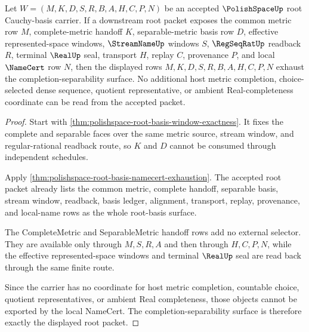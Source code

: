 \begin{theorem}
\label{thm:polishspace-root-completion-separability-exhaustion}
Let $W=(M,K,D,S,R,B,A,H,C,P,N)$ be an accepted $\PolishSpaceUp$ root Cauchy-basis carrier. If a downstream root packet exposes the common metric row $M$, complete-metric handoff $K$, separable-metric basis row $D$, effective represented-space windows, $\StreamNameUp$ windows $S$, $\RegSeqRatUp$ readback $R$, terminal $\RealUp$ seal, transport $H$, replay $C$, provenance $P$, and local $\NameCert$ row $N$, then the displayed rows $M,K,D,S,R,B,A,H,C,P,N$ exhaust the completion-separability surface. No additional host metric completion, choice-selected dense sequence, quotient representative, or ambient Real-completeness coordinate can be read from the accepted packet.
\end{theorem}
\begin{proof}
Start with \autoref{thm:polishspace-root-basis-window-exactness}. It fixes the complete and separable faces over the same metric source, stream window, and regular-rational readback route, so $K$ and $D$ cannot be consumed through independent schedules.

Apply \autoref{thm:polishspace-root-basis-namecert-exhaustion}. The accepted root packet already lists the common metric, complete handoff, separable basis, stream window, readback, basis ledger, alignment, transport, replay, provenance, and local-name rows as the whole root-basis surface.

The CompleteMetric and SeparableMetric handoff rows add no external selector. They are available only through $M,S,R,A$ and then through $H,C,P,N$, while the effective represented-space windows and terminal $\RealUp$ seal are read back through the same finite route.

Since the carrier has no coordinate for host metric completion, countable choice, quotient representatives, or ambient Real completeness, those objects cannot be exported by the local NameCert. The completion-separability surface is therefore exactly the displayed root packet.
\end{proof}

